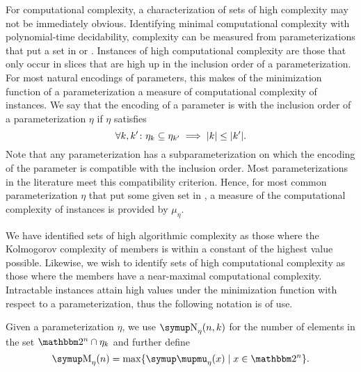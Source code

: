 For computational complexity, a characterization of sets of high complexity may not be immediately obvious.
Identifying minimal computational complexity with polynomial-time decidability, complexity can be measured from parameterizations that put a set in  or .
Instances of high computational complexity are those that only occur in slices that are high up in the inclusion order of a parameterization.
For most natural encodings of parameters, this makes of the minimization function of a parameterization a measure of computational complexity of instances.
We say that the encoding of a parameter is  with the inclusion order of a parameterization $\eta$ if $\eta$ satisfies
\begin{equation}
\label{eq:compatible}
  \forall k, k'\colon \eta_k \subseteq \eta_{k'} \implies {\lvert k\rvert} \le {\lvert k'\rvert}.
\end{equation}
Note that any parameterization has a subparameterization on which the encoding of the parameter is compatible with the inclusion order.
Most parameterizations in the literature \parencite[e.g.][]{downey1999parameterized,flum2006parameterized,niedermeier2006invitation,cygan2015parameterized} meet this compatibility criterion.
Hence, for most common parameterization $\eta$ that put some given set in , a measure of the computational complexity of instances is provided by $\mu_\eta$.

We have identified sets of high algorithmic complexity as those where the Kolmogorov complexity of members is within a constant of the highest value possible.
Likewise, we wish to identify sets of high computational complexity as those where the members have a near-maximal computational complexity.
Intractable instances attain high values under the minimization function with respect to a parameterization, thus the following notation is of use.
\begin{definition}
  Given a parameterization $\eta$, we use $\upN_\eta(n, k)$ for the number of elements in the set $\binary^n \cap \eta_k$ and further define
  \begin{equation*}
    \upM_\eta(n) \deq \max\{\mu_\eta(x) \st x \in \binary^n\}.
  \end{equation*}
\end{definition}

